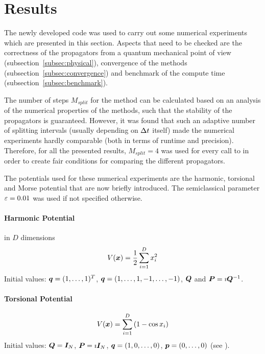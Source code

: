 \section{Results}
\label{sec:results}
%
The newly developed code was used to carry out some numerical experiments which are presented in this section.
Aspects that need to be checked are the correctness of the propagators from a quantum mechanical point of view (subsection~\ref{subsec:physical}), convergence of the methods (subsection~\ref{subsec:convergence}) and benchmark of the compute time (subsection~\ref{subsec:benchmark}).
\par\medskip
%
The number of steps $M_{split}$ for the  method can be calculated based on an analysis of the numerical properties of the methods, such that the stability of the propagators is guaranteed.
However, it was found that such an adaptive number of splitting intervals (usually depending on $\Delta t$ itself) made the numerical experiments hardly comparable (both in terms of runtime and precision).
Therefore, for all the presented results, $M_{split}=4$ was used for every call to  in order to create fair conditions for comparing the different propagators.
\par\medskip
%
The potentials used for these numerical experiments are the harmonic, torsional and Morse potential that are now briefly introduced.
The semiclassical parameter $\varepsilon = 0.01$ was used if not specified otherwise.


\paragraph{Harmonic Potential} in $D$ dimensions
\begin{align}
	\label{math:harmonic}
	V(\bm{x}) = \frac{1}{2} \sum_{i=1}^D x_i^2
\end{align}
%
Initial values: $\bm{q} = (1,\dots,1)^T$, $\bm{q} = (1,\dots,1,-1,\dots,-1)$, $\bm{Q}$ and $\bm{P} = \imath \bm{Q}^{-1}$. \\
\par\medskip


\paragraph{Torsional Potential}
%
\begin{align}
	\label{math:torsional}
	V(\bm{x}) = \sum_{i=1}^D \left( 1 - \cos x_i \right)
\end{align}
%
Initial values: $\bm{Q} = \bm{I}_N$, $\bm{P} = \imath \bm{I}_N$, $\bm{q} = (1,0,\dots,0)$, $\bm{p} = (0,\dots,0)$ (see \cite{FGL_semiclassical_dynamics}).

